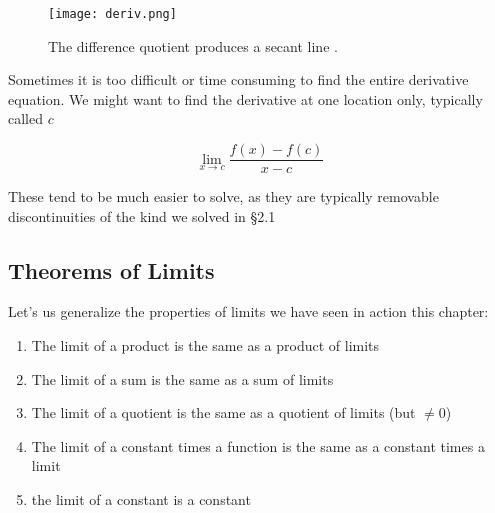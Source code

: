 \begin{figure}
\begin{center}
\texttt{[image: deriv.png]}
\caption{The difference quotient produces a secant line \cite{derivativedefinition}.}
\end{center}
\end{figure}

Sometimes it is too difficult or time consuming to find the entire derivative equation.
We might want to find the derivative at one location only, typically called $c$

\begin{equation}
\lim_{x\rightarrow c}\frac{f(x)-f(c)}{x-c}
\end{equation}

These tend to be much easier to solve, as they are typically removable discontinuities
of the kind we solved in §2.1

\subsection{Theorems of Limits}
Let's us generalize the properties of limits we have seen in action this chapter:
\begin{enumerate}
\item The limit of a product is the same as a product of limits
\item The limit of a sum is the same as a sum of limits
\item The limit of a quotient is the same as a quotient of limits (but $\ne 0$)
\item The limit of a constant times a function is the same as a constant times a limit
\item the limit of a constant is a constant
\end{enumerate}

